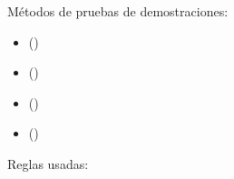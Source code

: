 %
\begin{isabellebody}%
%
%
\isadelimtheory
%
\endisadelimtheory
%
\isatagtheory
%
\endisatagtheory
{\isafoldtheory}%
%
\isadelimtheory
%
\endisadelimtheory
%
\isadelimdocument
%
\endisadelimdocument
%
\isatagdocument
%
\isamarkuptrue%
%
\endisatagdocument
{\isafolddocument}%
%
\isadelimdocument
%
\endisadelimdocument
%
\begin{isamarkuptext}%
Métodos de pruebas de demostraciones:

 \begin{itemize}
  \item[]  \hfill ()
  \end{itemize}

 \begin{itemize}
  \item[]  \hfill ()
  \end{itemize}

 \begin{itemize}
  \item[]  \hfill ()
  \end{itemize}

 \begin{itemize}
  \item[]  \hfill ()
  \end{itemize}


Reglas usadas:


\end{isamarkuptext}
\end{isabellebody}
